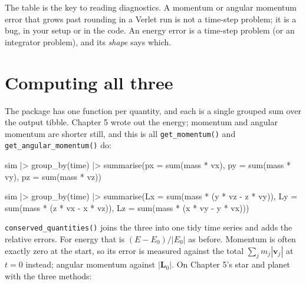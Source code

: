 \documentclass[
  10.5pt,
  letterpaper,
]{scrbook}
\newenvironment{Shaded}{\begin{snugshade}}{\end{snugshade}}
\newcommand{\AttributeTok}[1]{\textcolor[rgb]{0.00,0.00,0.00}{#1}}
\newcommand{\FunctionTok}[1]{\textcolor[rgb]{0.00,0.00,0.00}{#1}}
\newcommand{\NormalTok}[1]{\textcolor[rgb]{0.00,0.00,0.00}{#1}}
\newcommand{\SpecialCharTok}[1]{\textcolor[rgb]{0.00,0.00,0.00}{#1}}
\theoremstyle{plain}
\theoremstyle{remark}
\begin{document}
The table is the key to reading diagnostics. A momentum or angular
momentum error that grows past rounding in a Verlet run is not a
time-step problem; it is a bug, in your setup or in the code. An energy
error is a time-step problem (or an integrator problem), and its
\emph{shape} says which.

\section{Computing all three}\label{computing-all-three}

The package has one function per quantity, and each is a single grouped
sum over the output tibble. Chapter 5 wrote out the energy; momentum and
angular momentum are shorter still, and this is all
\texttt{get\_momentum()} and \texttt{get\_angular\_momentum()} do:

\begin{Shaded}
\begin{Highlighting}[]
\NormalTok{sim }\SpecialCharTok{|\textgreater{}}
  \FunctionTok{group\_by}\NormalTok{(time) }\SpecialCharTok{|\textgreater{}}
  \FunctionTok{summarise}\NormalTok{(}\AttributeTok{px =} \FunctionTok{sum}\NormalTok{(mass }\SpecialCharTok{*}\NormalTok{ vx), }\AttributeTok{py =} \FunctionTok{sum}\NormalTok{(mass }\SpecialCharTok{*}\NormalTok{ vy), }\AttributeTok{pz =} \FunctionTok{sum}\NormalTok{(mass }\SpecialCharTok{*}\NormalTok{ vz))}

\NormalTok{sim }\SpecialCharTok{|\textgreater{}}
  \FunctionTok{group\_by}\NormalTok{(time) }\SpecialCharTok{|\textgreater{}}
  \FunctionTok{summarise}\NormalTok{(}\AttributeTok{Lx =} \FunctionTok{sum}\NormalTok{(mass }\SpecialCharTok{*}\NormalTok{ (y }\SpecialCharTok{*}\NormalTok{ vz }\SpecialCharTok{{-}}\NormalTok{ z }\SpecialCharTok{*}\NormalTok{ vy)),}
            \AttributeTok{Ly =} \FunctionTok{sum}\NormalTok{(mass }\SpecialCharTok{*}\NormalTok{ (z }\SpecialCharTok{*}\NormalTok{ vx }\SpecialCharTok{{-}}\NormalTok{ x }\SpecialCharTok{*}\NormalTok{ vz)),}
            \AttributeTok{Lz =} \FunctionTok{sum}\NormalTok{(mass }\SpecialCharTok{*}\NormalTok{ (x }\SpecialCharTok{*}\NormalTok{ vy }\SpecialCharTok{{-}}\NormalTok{ y }\SpecialCharTok{*}\NormalTok{ vx)))}
\end{Highlighting}
\end{Shaded}

\texttt{conserved\_quantities()} joins the three into one tidy time
series and adds the relative errors. For energy that is
\((E - E_0)/|E_0|\) as before. Momentum is often exactly zero at the
start, so its error is measured against the total
\(\sum_j m_j|\mathbf{v}_j|\) at \(t = 0\) instead; angular momentum
against \(|\mathbf{L}_0|\). On Chapter 5's star and planet with the
three methods:
\end{document}
